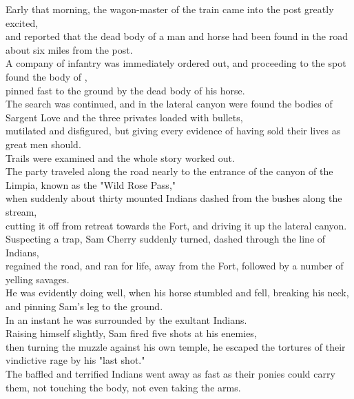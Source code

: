 
Early that morning, the wagon-master of the train came into the post greatly excited,\\
and reported that the dead body of a man and horse had been found in the road about six miles from the post.\\

A company of infantry was immediately ordered out, and proceeding to the spot found the body of ,\\
pinned fast to the ground by the dead body of his horse.\\

The search was continued, and in the lateral canyon were found the bodies of Sargent Love and the three privates loaded with bullets,\\
mutilated and disfigured, but giving every evidence of having sold their lives as great men should.\\

Trails were examined and the whole story worked out.\\

The party traveled along the road nearly to the entrance of the canyon of the Limpia, known as the "Wild Rose Pass,"\\
when suddenly about thirty mounted Indians dashed from the bushes along the stream,\\
cutting it off from retreat towards the Fort, and driving it up the lateral canyon.\\

Suspecting a trap, Sam Cherry suddenly turned, dashed through the line of Indians,\\
regained the road, and ran for life, away from the Fort, followed by a number of yelling savages.\\

He was evidently doing well, when his horse stumbled and fell, breaking his neck, and pinning Sam's leg to the ground.\\
In an instant he was surrounded by the exultant Indians.\\

Raising himself slightly, Sam fired five shots at his enemies,\\
then turning the muzzle against his own temple, he escaped the tortures of their vindictive rage by his "last shot."\\
The baffled and terrified Indians went away as fast as their ponies could carry them, not touching the body, not even taking the arms.\\

